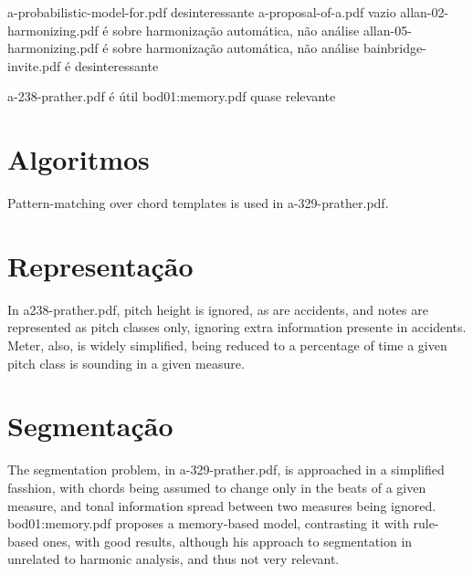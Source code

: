 a-probabilistic-model-for.pdf desinteressante
a-proposal-of-a.pdf vazio
allan-02-harmonizing.pdf é sobre harmonização automática, não análise
allan-05-harmonizing.pdf é sobre harmonização automática, não análise
bainbridge-invite.pdf é desinteressante




a-238-prather.pdf é útil
bod01:memory.pdf quase relevante


\section{Algoritmos}

Pattern-matching over chord templates is used in a-329-prather.pdf.


\section{Representação}

In a238-prather.pdf, pitch height is ignored, as are accidents, and
notes are represented as pitch classes only, ignoring extra
information presente in accidents. Meter, also, is widely simplified,
being reduced to a percentage of time a given pitch class is sounding
in a given measure.

\section{Segmentação}

The segmentation problem, in a-329-prather.pdf, is approached in a
simplified fasshion, with chords being assumed to change only in the
beats of a given measure, and tonal information spread between two
measures being ignored. bod01:memory.pdf proposes a memory-based
model, contrasting it with rule-based ones, with good results,
although his approach to segmentation in unrelated to harmonic
analysis, and thus not very relevant. 
